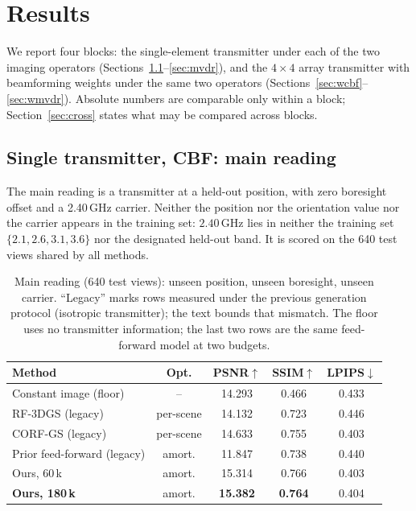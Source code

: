 \documentclass[conference]{IEEEtran}
\begin{document}
\section{Results}
\label{sec:results}

We report four blocks: the single-element transmitter under each of the two
imaging operators (Sections~\ref{sec:main}--\ref{sec:mvdr}), and the
$4\times4$ array transmitter with beamforming weights under the same two
operators (Sections~\ref{sec:wcbf}--\ref{sec:wmvdr}). Absolute numbers are
comparable only within a block; Section~\ref{sec:cross} states what may be
compared across blocks.

\subsection{Single transmitter, CBF: main reading}
\label{sec:main}

The main reading is a transmitter at a held-out position, with zero boresight
offset and a 2.40\,GHz carrier. Neither the position nor the orientation value
nor the carrier appears in the training set: $2.40$\,GHz lies in neither the
training set $\{2.1,2.6,3.1,3.6\}$ nor the designated held-out band. It is
scored on the 640 test views shared by all methods.

\begin{table}[!t]
\centering
\caption{Main reading (640 test views): unseen position, unseen boresight,
unseen carrier. ``Legacy'' marks rows measured under the previous generation
protocol (isotropic transmitter); the text bounds that mismatch. The floor uses
no transmitter information; the last two rows are the same feed-forward model at
two budgets.}
\label{tab:main}
\small
\setlength{\tabcolsep}{4pt}
\begin{tabular}{@{}lcccc@{}}
\toprule
Method & Opt. & PSNR$\uparrow$ & SSIM$\uparrow$ & LPIPS$\downarrow$ \\
\midrule
Constant image (floor) & -- & 14.293 & 0.466 & 0.433 \\
RF-3DGS \cite{rf3dgs} (legacy) & per-scene & 14.132 & 0.723 & 0.446 \\
CORF-GS \cite{corfgs} (legacy) & per-scene & 14.633 & 0.755 & 0.403 \\
Prior feed-forward (legacy) & amort. & 11.847 & 0.738 & 0.440 \\
Ours, 60\,k & amort. & 15.314 & 0.766 & 0.403 \\
\textbf{Ours, 180\,k} & amort. & \textbf{15.382} & \textbf{0.764} & 0.404 \\
\bottomrule
\end{tabular}
\end{table}
\end{document}
